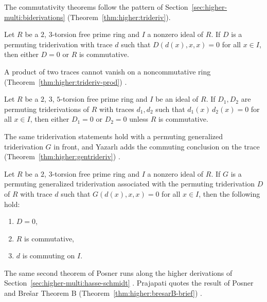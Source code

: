 The commutativity theorems follow the pattern of
Section~\ref{sec:higher-multi:biderivations} \cite[p.~490]{Yazarli2017Trideriv} (Theorem~\ref{thm:higher:trideriv}).

\begin{theorem}\label{thm:higher:trideriv}
Let $R$ be a $2$, $3$-torsion free prime ring and $I$ a nonzero ideal of
$R$. If $D$ is a permuting triderivation with trace $d$ such that
$D(d(x),x,x)=0$ for all $x\in I$, then either $D=0$ or $R$ is commutative.
\end{theorem}

A product of two traces cannot vanish on a noncommutative ring (Theorem~\ref{thm:higher:trideriv-prod})
\cite[p.~492]{Yazarli2017Trideriv}.\begin{theorem}\label{thm:higher:trideriv-prod}
Let $R$ be a $2$, $3$, $5$-torsion free prime ring and $I$ be an ideal of
$R$. If $D_1,D_2$ are permuting triderivations of $R$ with traces $d_1,d_2$
such that $d_1(x)\,d_2(x)=0$ for all $x\in I$, then either $D_1=0$ or
$D_2=0$ unless $R$ is commutative.
\end{theorem}

The same triderivation statements hold with a permuting generalized
triderivation $G$ in front, and Yazarlı adds the commuting conclusion on
the trace (Theorem~\ref{thm:higher:gentrideriv}) \cite[p.~494]{Yazarli2017Trideriv}.

\begin{theorem}\label{thm:higher:gentrideriv}
Let $R$ be a $2$, $3$-torsion free prime ring and $I$ a nonzero ideal of
$R$. If $G$ is a permuting generalized triderivation associated with the
permuting triderivation $D$ of $R$ with trace $d$ such that
$G(d(x),x,x)=0$ for all $x\in I$, then the following hold:
\begin{enumerate}
\item $D=0$,
\item $R$ is commutative,
\item $d$ is commuting on $I$.
\end{enumerate}
\end{theorem}

The same second theorem of Posner runs along the higher derivations of
Section~\ref{sec:higher-multi:hasse-schmidt}
\cite[p.~4]{Prajapati2021}. Prajapati quotes the result of Posner and Brešar
Theorem B (Theorem~\ref{thm:higher:bresarB-brief}) \cite[p.~4]{Prajapati2021}.

